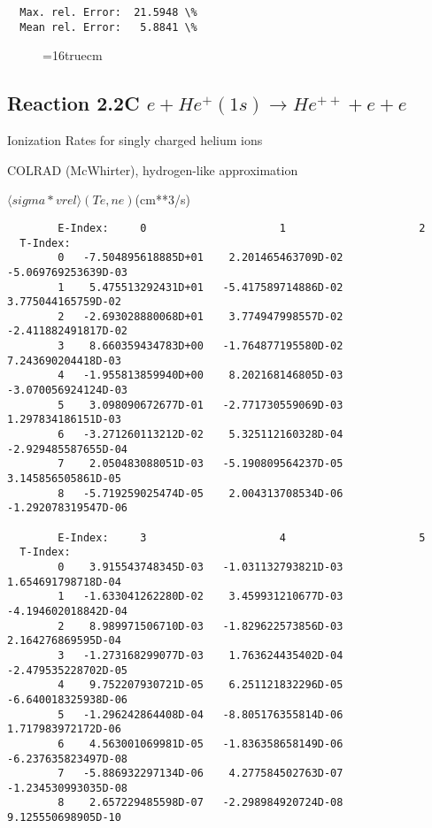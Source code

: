 \documentclass[12pt,dvipdfmx]{article}
\begin{document}
{\begin{small}
\begin{verbatim}
  Max. rel. Error:  21.5948 \%
  Mean rel. Error:   5.8841 \%

\end{verbatim}\end{small}
\begin{figure} \label{2.3.13d}
\epsfxsize=16truecm
\end{figure}
\newpage



\subsection{
Reaction 2.2C $e + He^+(1s) \rightarrow He^{++}  + e  + e $
}
  Ionization Rates for singly charged helium ions

  COLRAD (McWhirter), hydrogen-like approximation \cite{kn:McWhirter}

$  \langle sigma*vrel \rangle(Te,ne) $(cm**3/s)

\begin{small}\begin{verbatim}
        E-Index:     0                     1                     2
  T-Index:
        0   -7.504895618885D+01    2.201465463709D-02   -5.069769253639D-03
        1    5.475513292431D+01   -5.417589714886D-02    3.775044165759D-02
        2   -2.693028880068D+01    3.774947998557D-02   -2.411882491817D-02
        3    8.660359434783D+00   -1.764877195580D-02    7.243690204418D-03
        4   -1.955813859940D+00    8.202168146805D-03   -3.070056924124D-03
        5    3.098090672677D-01   -2.771730559069D-03    1.297834186151D-03
        6   -3.271260113212D-02    5.325112160328D-04   -2.929485587655D-04
        7    2.050483088051D-03   -5.190809564237D-05    3.145856505861D-05
        8   -5.719259025474D-05    2.004313708534D-06   -1.292078319547D-06

        E-Index:     3                     4                     5
  T-Index:
        0    3.915543748345D-03   -1.031132793821D-03    1.654691798718D-04
        1   -1.633041262280D-02    3.459931210677D-03   -4.194602018842D-04
        2    8.989971506710D-03   -1.829622573856D-03    2.164276869595D-04
        3   -1.273168299077D-03    1.763624435402D-04   -2.479535228702D-05
        4    9.752207930721D-05    6.251121832296D-05   -6.640018325938D-06
        5   -1.296242864408D-04   -8.805176355814D-06    1.717983972172D-06
        6    4.563001069981D-05   -1.836358658149D-06   -6.237635823497D-08
        7   -5.886932297134D-06    4.277584502763D-07   -1.234530993035D-08
        8    2.657229485598D-07   -2.298984920724D-08    9.125550698905D-10


\end{verbatim}
\end{small}}
\end{document}
